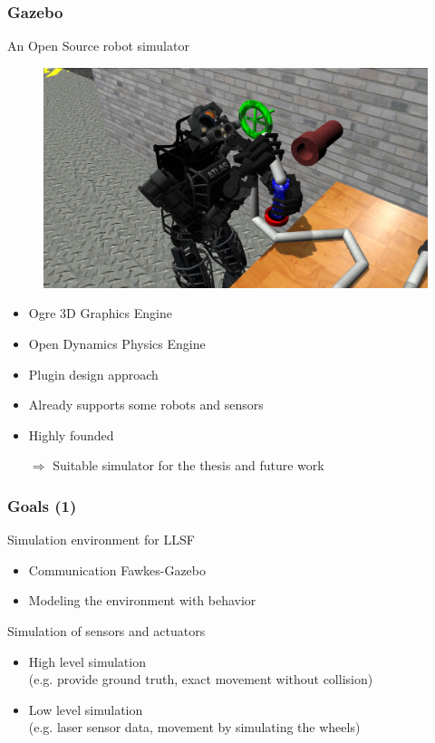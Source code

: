 \documentclass{beamer}
\begin{document}
\begin{frame}
\frametitle{Gazebo}
\begin{multicols}{2}
An Open Source robot simulator
\begin{figure}
\includegraphics[scale=0.125]{pics/gazebo.jpg}
\end{figure}
\begin{itemize}
\item Ogre 3D Graphics Engine %
\item Open Dynamics Physics Engine %
\item Plugin design approach
\item Already supports some robots and sensors %
\item Highly founded
\end{itemize}
\end{multicols}
\begin{itemize}
\item[$\Rightarrow$] Suitable simulator for the thesis and future work
\end{itemize}
\end{frame}

\begin{frame}
\frametitle{Goals (1)}
Simulation environment for LLSF
\begin{itemize}
\item Communication Fawkes-Gazebo
\item Modeling the environment with behavior
\end{itemize}
Simulation of sensors and actuators
\begin{itemize}
\item High level simulation\\(e.g. provide ground truth, exact movement without collision)
\item Low level simulation\\(e.g. laser sensor data, movement by simulating the wheels)
\end{itemize}
\end{frame}
\end{document}
